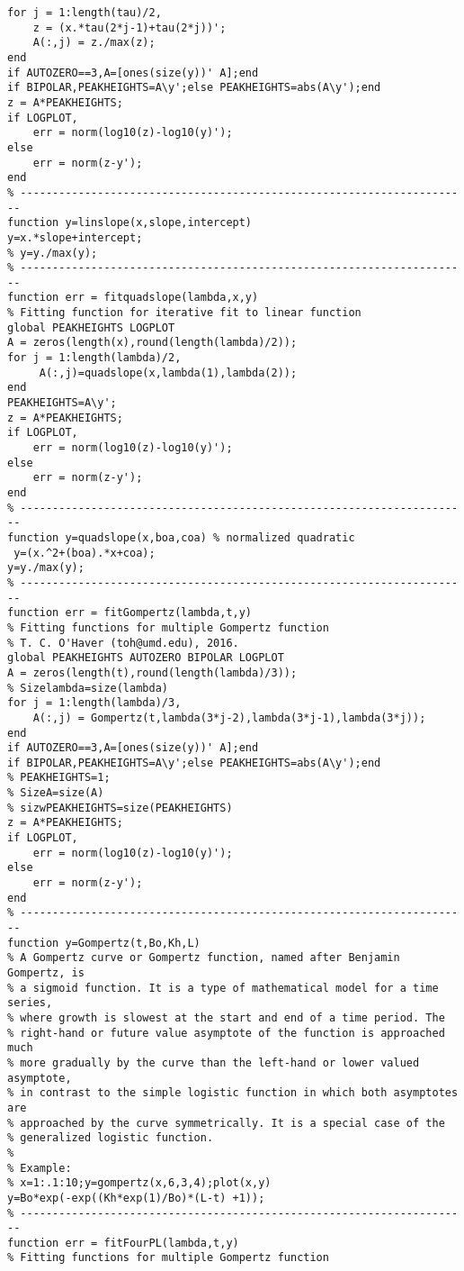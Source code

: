 \begin{lstlisting}
for j = 1:length(tau)/2,
    z = (x.*tau(2*j-1)+tau(2*j))';
    A(:,j) = z./max(z);
end
if AUTOZERO==3,A=[ones(size(y))' A];end
if BIPOLAR,PEAKHEIGHTS=A\y';else PEAKHEIGHTS=abs(A\y');end
z = A*PEAKHEIGHTS;
if LOGPLOT,
    err = norm(log10(z)-log10(y)');
else
    err = norm(z-y');
end
% ----------------------------------------------------------------------
function y=linslope(x,slope,intercept)
y=x.*slope+intercept;
% y=y./max(y);
% ----------------------------------------------------------------------
function err = fitquadslope(lambda,x,y)
% Fitting function for iterative fit to linear function
global PEAKHEIGHTS LOGPLOT
A = zeros(length(x),round(length(lambda)/2));
for j = 1:length(lambda)/2,
     A(:,j)=quadslope(x,lambda(1),lambda(2));
end
PEAKHEIGHTS=A\y';
z = A*PEAKHEIGHTS;
if LOGPLOT,
    err = norm(log10(z)-log10(y)');
else
    err = norm(z-y');
end
% ----------------------------------------------------------------------
function y=quadslope(x,boa,coa) % normalized quadratic
 y=(x.^2+(boa).*x+coa);
y=y./max(y);
% ----------------------------------------------------------------------
function err = fitGompertz(lambda,t,y)
% Fitting functions for multiple Gompertz function
% T. C. O'Haver (toh@umd.edu), 2016.
global PEAKHEIGHTS AUTOZERO BIPOLAR LOGPLOT
A = zeros(length(t),round(length(lambda)/3));
% Sizelambda=size(lambda)
for j = 1:length(lambda)/3,
    A(:,j) = Gompertz(t,lambda(3*j-2),lambda(3*j-1),lambda(3*j));
end
if AUTOZERO==3,A=[ones(size(y))' A];end
if BIPOLAR,PEAKHEIGHTS=A\y';else PEAKHEIGHTS=abs(A\y');end
% PEAKHEIGHTS=1;
% SizeA=size(A)
% sizwPEAKHEIGHTS=size(PEAKHEIGHTS)
z = A*PEAKHEIGHTS;
if LOGPLOT,
    err = norm(log10(z)-log10(y)');
else
    err = norm(z-y');
end
% ----------------------------------------------------------------------
function y=Gompertz(t,Bo,Kh,L)
% A Gompertz curve or Gompertz function, named after Benjamin Gompertz, is
% a sigmoid function. It is a type of mathematical model for a time series,
% where growth is slowest at the start and end of a time period. The
% right-hand or future value asymptote of the function is approached much
% more gradually by the curve than the left-hand or lower valued asymptote,
% in contrast to the simple logistic function in which both asymptotes are
% approached by the curve symmetrically. It is a special case of the
% generalized logistic function.
% 
% Example:
% x=1:.1:10;y=gompertz(x,6,3,4);plot(x,y)
y=Bo*exp(-exp((Kh*exp(1)/Bo)*(L-t) +1));
% ----------------------------------------------------------------------
function err = fitFourPL(lambda,t,y)
% Fitting functions for multiple Gompertz function

\end{lstlisting}
